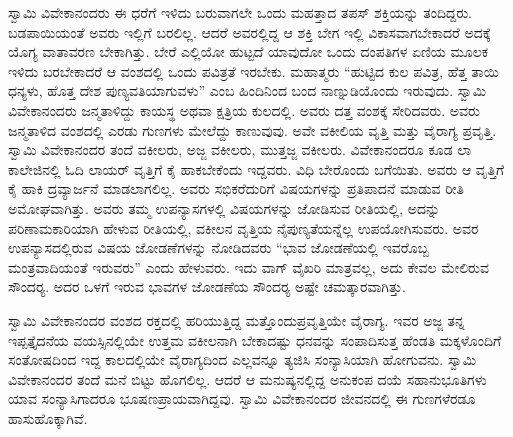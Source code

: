 ಸ್ವಾಮಿ ವಿವೇಕಾನಂದರು ಈ ಧರೆಗೆ ಇಳಿದು ಬರುವಾಗಲೇ ಒಂದು ಮಹತ್ತಾದ ತಪಸ್ ಶಕ್ತಿಯನ್ನು ತಂದಿದ್ದರು. ಬಡಪಾಯಿಯಂತೆ ಅವರು ಇಲ್ಲಿಗೆ ಬರಲಿಲ್ಲ. ಆದರೆ ಅವರಲ್ಲಿದ್ದ ಆ ಶಕ್ತಿ ಬೇಗ ಇಲ್ಲಿ ವಿಕಾಸವಾಗಬೇಕಾದರೆ ಅದಕ್ಕೆ ಯೊಗ್ಯ ವಾತಾವರಣ ಬೇಕಾಗಿತ್ತು. ಬೇರೆ ಎಲ್ಲಿಯೋ ಹುಟ್ಟದೆ ಯಾವುದೋ ಒಂದು ದಂಪತಿಗಳ ಏಣಿಯ ಮೂಲಕ ಇಳಿದು ಬರಬೇಕಾದರೆ ಆ ವಂಶದಲ್ಲಿ ಒಂದು ಪವಿತ್ರತೆ ಇರಬೇಕು. ಮಹಾತ್ಮರು “ಹುಟ್ಟಿದ ಕುಲ ಪವಿತ್ರ, ಹೆತ್ತ ತಾಯಿ ಧನ್ಯಳು, ಹೊತ್ತ ದೇಶ ಪುಣ್ಯವತಿಯಾಗುವಳು” ಎಂಬ ಹಿಂದಿನಿಂದ ಬಂದ ನಾಣ್ನುಡಿಯೊಂದು ಇರುವುದು. ಸ್ವಾಮಿ ವಿವೇಕಾನಂದರು ಜನ್ಮತಾಳಿದ್ದು ಕಾಯಸ್ಥ ಅಥವಾ ಕ್ಷತ್ರಿಯ ಕುಲದಲ್ಲಿ. ಅವರು ದತ್ತ ವಂಶಕ್ಕೆ ಸೇರಿದವರು. ಅವರು ಜನ್ಮತಾಳಿದ ವಂಶದಲ್ಲಿ ಎರಡು ಗುಣಗಳು ಮೇಲೆದ್ದು ಕಾಣುವುವು. ಅವೇ ವಕೀಲಿಯ ವೃತ್ತಿ ಮತ್ತು ವೈರಾಗ್ಯ ಪ್ರವೃತ್ತಿ. ಸ್ವಾಮಿ ವಿವೇಕಾನಂದರ ತಂದೆ ವಕೀಲರು, ಅಜ್ಜ ವಕೀಲರು, ಮುತ್ತಜ್ಜ ವಕೀಲರು. ವಿವೇಕಾನಂದರೂ ಕೂಡ ಲಾ ಕಾಲೇಜಿನಲ್ಲಿ ಓದಿ ಲಾಯರ್ ವೃತ್ತಿಗೆ ಕೈ ಹಾಕಬೇಕೆಂದು ಇದ್ದವರು. ವಿಧಿ ಬೇರೊಂದು ಬಗೆಯಿತು. ಅವರು ಆ ವೃತ್ತಿಗೆ ಕೈ ಹಾಕಿ ದ್ರವ್ಯಾರ್ಜನೆ ಮಾಡಲಾಗಲಿಲ್ಲ. ಅವರು ಸಭಿಕರೆದುರಿಗೆ ವಿಷಯಗಳನ್ನು ಪ್ರತಿಪಾದನೆ ಮಾಡುವ ರೀತಿ ಅಮೋಘವಾಗಿತ್ತು. ಅವರು ತಮ್ಮ ಉಪನ್ಯಾಸಗಳಲ್ಲಿ ವಿಷಯಗಳನ್ನು ಜೋಡಿಸುವ ರೀತಿಯಲ್ಲಿ, ಅದನ್ನು ಪರಿಣಾಮಕಾರಿಯಾಗಿ ಹೇಳುವ ರೀತಿಯಲ್ಲಿ, ವಕೀಲನ ವೃತ್ತಿಯ ನೈಪುಣ್ಯತೆಯನ್ನೆಲ್ಲ ಉಪಯೋಗಿಸುವರು. ಅವರ ಉಪನ್ಯಾಸದಲ್ಲಿರುವ ವಿಷಯ ಜೋಡಣೆಗಳನ್ನು ನೋಡಿದವರು “ಭಾವ ಜೋಡಣೆಯಲ್ಲಿ ಇವರೊಬ್ಬ ಮಂತ್ರವಾದಿಯಂತೆ ಇರುವರು” ಎಂದು ಹೇಳುವರು. ಇದು ವಾಗ್ ವೈಖರಿ ಮಾತ್ರವಲ್ಲ, ಅದು ಕೇವಲ ಮೇಲಿರುವ ಸೌಂದರ‍್ಯ. ಅದರ ಒಳಗೆ ಇರುವ ಭಾವಗಳ ಜೋಡಣೆಯ ಸೌಂದರ‍್ಯ ಅಷ್ಟೇ ಚಮತ್ಕಾರವಾಗಿತ್ತು.

ಸ್ವಾಮಿ ವಿವೇಕಾನಂದರ ವಂಶದ ರಕ್ತದಲ್ಲಿ ಹರಿಯುತ್ತಿದ್ದ ಮತ್ತೊಂದು\break ಪ್ರವೃತ್ತಿಯೇ ವೈರಾಗ್ಯ. ಇವರ ಅಜ್ಜ ತನ್ನ ಇಪ್ಪತ್ತೈದನೆಯ ವಯಸ್ಸಿನಲ್ಲಿಯೇ ಉತ್ತಮ ವಕೀಲನಾಗಿ ಬೇಕಾದಷ್ಟು ಧನವನ್ನು ಸಂಪಾದಿಸುತ್ತ ಹೆಂಡತಿ ಮಕ್ಕಳೊಂದಿಗೆ ಸಂತೋಷದಿಂದ ಇದ್ದ ಕಾಲದಲ್ಲಿಯೇ ವೈರಾಗ್ಯದಿಂದ ಎಲ್ಲವನ್ನೂ ತ್ಯಜಿಸಿ ಸಂನ್ಯಾಸಿಯಾಗಿ ಹೋಗುವನು. ಸ್ವಾಮಿ ವಿವೇಕಾನಂದರ ತಂದೆ ಮನೆ ಬಿಟ್ಟು ಹೊಗಲಿಲ್ಲ. ಆದರೆ ಆ ಮನುಷ್ಯನಲ್ಲಿದ್ದ ಅನುಕಂಪ ದಯೆ ಸಹಾನುಭೂತಿಗಳು ಯಾವ ಸಂನ್ಯಾಸಿಗಾದರೂ ಭೂಷಣಪ್ರಾಯವಾಗಿದ್ದವು. ಸ್ವಾಮಿ ವಿವೇಕಾನಂದರ ಜೀವನದಲ್ಲಿ ಈ ಗುಣಗಳೆರಡೂ ಹಾಸುಹೊಕ್ಕಾಗಿವೆ. 

